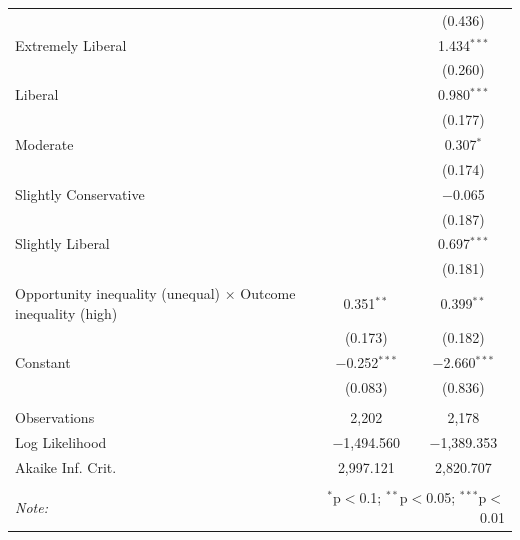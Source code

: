 \begin{table}[H]
\begin{tabular}{@{\extracolsep{5pt}}lcc}
  &  & (0.436) \\ 
  Extremely Liberal &  & 1.434$^{***}$ \\ 
  &  & (0.260) \\ 
  Liberal &  & 0.980$^{***}$ \\ 
  &  & (0.177) \\ 
  Moderate &  & 0.307$^{*}$ \\ 
  &  & (0.174) \\ 
  Slightly Conservative &  & $-$0.065 \\ 
  &  & (0.187) \\ 
  Slightly Liberal &  & 0.697$^{***}$ \\ 
  &  & (0.181) \\ 
  Opportunity inequality (unequal) × Outcome inequality (high) & 0.351$^{**}$ & 0.399$^{**}$ \\ 
  & (0.173) & (0.182) \\ 
  Constant & $-$0.252$^{***}$ & $-$2.660$^{***}$ \\ 
  & (0.083) & (0.836) \\ 
 \hline \\[-1.8ex] 
Observations & 2,202 & 2,178 \\ 
Log Likelihood & $-$1,494.560 & $-$1,389.353 \\ 
Akaike Inf. Crit. & 2,997.121 & 2,820.707 \\ 
\hline 
\hline \\[-1.8ex] 
\textit{Note:}  & \multicolumn{2}{r}{$^{*}$p$<$0.1; $^{**}$p$<$0.05; $^{***}$p$<$0.01} \\ 
\end{tabular} 
\end{table} 
